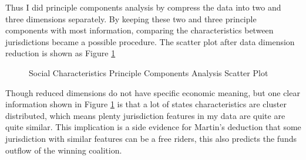 Thus I did principle components analysis by compress the data into two and three dimensions separately. By keeping these two and three principle components with most information, comparing the characteristics between jurisdictions became a possible procedure. The scatter plot after data dimension reduction is shown as Figure \ref*{Figure 2.2}


\begin{figure}[H]
    \centering  %
    \caption[Principle Components Analysis Scatter Plot]{Social Characteristics Principle Components Analysis Scatter Plot}    %
    \label{Figure 2.2}    %
\end{figure}

Though reduced dimensions do not have specific economic meaning, but one clear information shown in Figure \ref*{Figure 2.2} is that a lot of states characteristics are cluster distributed, which means plenty jurisdiction features in my data are quite are quite similar. This implication is a side evidence for Martin's \cite{martin2018dividing} deduction that some jurisdiction with similar features can be a free riders, this also predicts the funds outflow of the winning coalition.

